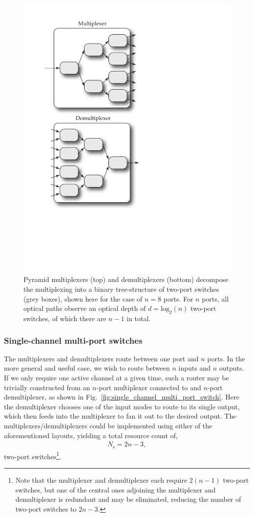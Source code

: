 \documentclass[aps, rmp, twocolumn, amsmath, amssymb, nofootinbib, superscriptaddress, longbibliography, floatfix, table-of-contents, eqsecnum]{revtex4-1}
\begin{document}
\begin{figure}[!htb]
\includegraphics[width=0.7\columnwidth]{pyramid_multiplexer}
\caption{Pyramid multiplexers (top) and demultiplexers (bottom) decompose the multiplexing into a binary tree-structure of two-port switches (grey boxes), shown here for the case of \mbox{$n=8$} ports. For $n$ ports, all optical paths observe an optical depth of \mbox{$d=\text{log}_2(n)$} two-port switches, of which there are \mbox{$n-1$} in total.} \label{fig:pyramid_multiplexer} 
\end{figure}

%
%

\subsubsection{Single-channel multi-port switches} 

The multiplexers and demultiplexers route between one port and $n$ ports. In the more general and useful case, we wish to route between $n$ inputs and $n$ outputs. If we only require one active channel at a given time, such a router may be trivially constructed from an $n$-port multiplexer connected to and $n$-port demultiplexer, as shown in Fig.~\ref{fig:single_channel_multi_port_switch}. Here the demultiplexer chooses one of the input modes to route to its single output, which then feeds into the multiplexer to fan it out to the desired output. The multiplexers/demultiplexers could be implemented using either of the aforementioned layouts, yielding a total resource count of,
\begin{align}
	N_\text{s} = 2n-3,
\end{align}
two-port switches\footnote{Note that the multiplexer and demultiplexer each require \mbox{$2(n-1)$} two-port switches, but one of the central ones adjoining the multiplexer and demultiplexer is redundant and may be eliminated, reducing the number of two-port switches to \mbox{$2n-3$}.}.
\end{document}
